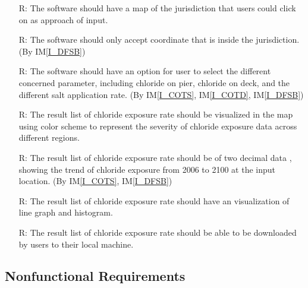 \documentclass[12pt]{article}
\newcommand{\iref}[1]{IM\ref{#1}}
\newcounter{reqnum} %
\begin{document}
\begin{itemize}
\item[R\refstepcounter{reqnum}\thereqnum \label{R_InputMap}:] The software should have a map of the jurisdiction that users could click on as approach of input.

\item[R\refstepcounter{reqnum}\thereqnum \label{R_Inputs}:] The software should only accept coordinate that is inside the jurisdiction. (By \iref{I_DFSB})

\item[R\refstepcounter{reqnum}\thereqnum \label{R_Parameter}:] The software should have an option for user to select the different concerned parameter, including chloride on pier, chloride on deck, and the different salt application rate. (By \iref{I_COTS}, \iref{I_COTD},  \iref{I_DFSB})

\item[R\refstepcounter{reqnum}\thereqnum \label{R_Map}:] The result list of chloride exposure rate should be visualized in the map using color scheme to represent the severity of chloride exposure data across different regions.

\item[R\refstepcounter{reqnum}\thereqnum \label{R_OutputInputs}:] The result list of chloride exposure rate should be of two decimal data %
, showing the trend of chloride exposure from 2006 to 2100 at the input location. (By \iref{I_COTS}, \iref{I_DFSB})

\item[R\refstepcounter{reqnum}\thereqnum \label{R_OutputVisualization}:] The result list of chloride exposure rate should have an visualization of line graph and histogram. %

\item[R\refstepcounter{reqnum}\thereqnum \label{R_OutputDownload}:] The result list of chloride exposure rate %
should be able to be downloaded by users to their local machine. 


\end{itemize}


\subsection{Nonfunctional Requirements}
\end{document}
